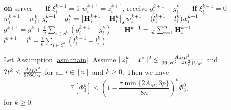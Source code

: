 \documentclass[11pt]{article}
\begin{document}
\begin{algorithm}[h!]
\begin{algorithmic}[1]
			\STATE \textbf{on} server
			\STATE ~~~{\color{blue}\textbf{if} $\xi_i^{k+1}=1$ }
			\STATE \quad \quad $w_i^{k+1} = z_i^{k+1}$, receive $g_i^{k+1}-g_i^k$
			\STATE ~~~{\color{blue}\textbf{if} $\xi_i^{k+1}=0$ } 
			\STATE \quad \quad $w_i^{k+1} = w_i^k$, $g_i^{k+1}-g_i^k = \left[ \mathbf{H}_i^{k+1} - \mathbf{H}_i^k \right]_s w_i^{k+1} +  (l_i^{k+1} - l_i^k) w_i^{k+1}$ 
			\STATE ~~~$g^{k+1} = g^k + \tfrac{1}{n}\sum_{i\in S^k} \left(  g_i^{k+1} - g_i^k  \right)$  
			\STATE ~~~$\mathbf{H}^{k+1} = \frac{1}{n} \sum_{i=1}^n \mathbf{H}_i^{k+1}$
			\STATE ~~~$l^{k+1} = l^k + \tfrac{1}{n}\sum_{i\in S^k} \left(  l_i^{k+1} - l_i^k  \right)$ 
		\end{algorithmic}
	\end{algorithm}
	
	
	
	
	
	
	
	
	\begin{theorem}\label{th:3PCBL2}
		Let Assumption \ref{asm:main}. Assume $\|z_i^k-x^*\|^2 \leq \frac{A_M \mu^2}{36(H^2 + 4L_{\rm F}^2)C_M}$ and ${\cal H}^k \leq \frac{A_M\mu^2}{576C_M}$ for all $i\in [n]$ and $k\geq 0$. Then we have 
		$$
		\mathbb{E}[\Phi_3^k] \leq \left(  1 - \frac{\tau \min\{  2A_M, 3p  \} }{8n}  \right) ^k \Phi_3^0, 
		$$
		for $k\geq 0$. 
	\end{theorem}
	
\end{document}
